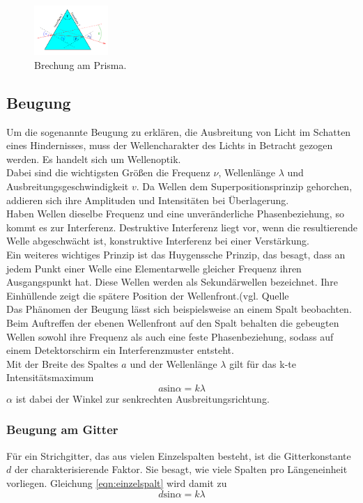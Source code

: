 \begin{figure}
    \centering
    \includegraphics[width=0.25\textwidth]{prisma.png}
    \caption{Brechung am Prisma.}
    \label{fig:prisma}
\end{figure}

\subsection{Beugung}
Um die sogenannte Beugung zu erklären, die Ausbreitung von Licht im 
Schatten eines Hindernisses, muss der Wellencharakter des Lichts in 
Betracht gezogen werden. Es handelt sich um Wellenoptik.\\
Dabei sind die wichtigsten Größen die Frequenz $\nu$, Wellenlänge $\lambda$
und Ausbreitungsgeschwindigkeit $v$. Da Wellen dem Superpositionsprinzip
gehorchen, addieren sich ihre Amplituden und Intensitäten bei Überlagerung.
\\
Haben Wellen dieselbe Frequenz und eine unveränderliche Phasenbeziehung,
so kommt es zur Interferenz. Destruktive Interferenz liegt vor, wenn die 
resultierende Welle abgeschwächt ist, konstruktive Interferenz bei einer
Verstärkung. \\
Ein weiteres wichtiges Prinzip ist das Huygenssche Prinzip, das besagt, dass
an jedem Punkt einer Welle eine Elementarwelle gleicher Frequenz ihren Ausgangspunkt
hat. Diese Wellen werden als Sekundärwellen bezeichnet. Ihre Einhüllende
zeigt die spätere Position der Wellenfront.(vgl. Quelle %
\\
Das Phänomen der Beugung lässt sich beispielsweise an einem Spalt beobachten.
Beim Auftreffen der ebenen Wellenfront auf den Spalt behalten die gebeugten
Wellen sowohl ihre Frequenz als auch eine feste Phasenbeziehung, sodass auf einem
Detektorschirm ein Interferenzmuster entsteht.\\
Mit der Breite des Spaltes $a$ und der Wellenlänge $\lambda$ gilt für das 
k-te Intensitätsmaximum 
\begin{equation}
    a \text{sin} \alpha = k \lambda
    \label{eqn:einzelspalt}
\end{equation}
$\alpha$ ist dabei der Winkel zur senkrechten Ausbreitungsrichtung.

\subsubsection{Beugung am Gitter}
Für ein Strichgitter, das aus vielen Einzelspalten besteht, ist die Gitterkonstante $d$
der charakterisierende Faktor. Sie besagt, wie viele Spalten pro Längeneinheit 
vorliegen. Gleichung \eqref{eqn:einzelspalt} wird damit zu
\begin{equation}
    d \text{sin} \alpha = k \lambda
    \label{eqn:strichgitter}
\end{equation}